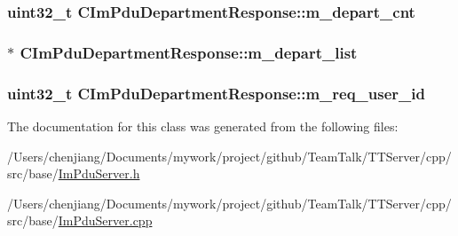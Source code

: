 \subsubsection[{m\+\_\+depart\+\_\+cnt}]{\setlength{\rightskip}{0pt plus 5cm}uint32\+\_\+t C\+Im\+Pdu\+Department\+Response\+::m\+\_\+depart\+\_\+cnt\hspace{0.3cm}{\ttfamily [private]}}\label{class_c_im_pdu_department_response_a706c98fb705e31b63ad97f66a1eb7749}
\hypertarget{class_c_im_pdu_department_response_a045ce4c43351332e938cabe25ab77e6c}{}
\subsubsection[{m\+\_\+depart\+\_\+list}]{$\ast$ C\+Im\+Pdu\+Department\+Response\+::m\+\_\+depart\+\_\+list\hspace{0.3cm}{\ttfamily [private]}}\label{class_c_im_pdu_department_response_a045ce4c43351332e938cabe25ab77e6c}
\hypertarget{class_c_im_pdu_department_response_a63bfb8c131d9e8b254dc77fc046833ad}{}
\subsubsection[{m\+\_\+req\+\_\+user\+\_\+id}]{\setlength{\rightskip}{0pt plus 5cm}uint32\+\_\+t C\+Im\+Pdu\+Department\+Response\+::m\+\_\+req\+\_\+user\+\_\+id\hspace{0.3cm}{\ttfamily [private]}}\label{class_c_im_pdu_department_response_a63bfb8c131d9e8b254dc77fc046833ad}


The documentation for this class was generated from the following files\+:\begin{DoxyCompactItemize}
\item 
/\+Users/chenjiang/\+Documents/mywork/project/github/\+Team\+Talk/\+T\+T\+Server/cpp/src/base/\hyperlink{_im_pdu_server_8h}{Im\+Pdu\+Server.\+h}\item 
/\+Users/chenjiang/\+Documents/mywork/project/github/\+Team\+Talk/\+T\+T\+Server/cpp/src/base/\hyperlink{_im_pdu_server_8cpp}{Im\+Pdu\+Server.\+cpp}\end{DoxyCompactItemize}

